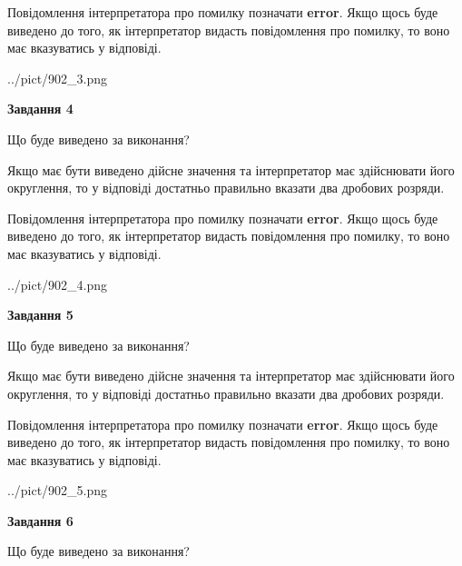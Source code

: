 \documentclass[12pt, ukrainian]{article}
\begin{document}
{\begin {Large}
Повідомлення інтерпретатора про помилку позначати \textbf{error}.
Якщо щось буде виведено до того, як інтерпретатор видасть повідомлення про помилку, 
то воно має вказуватись у відповіді. \par

\begin{center}
	{../pict/902_3.png}
\end{center}
\newpage

{\begin {center}\textbf{Завдання 4}\end {center}}\par
Що буде виведено за виконання? \par

Якщо має бути виведено дійсне значення та інтерпретатор має здійснювати його округлення, 
то у відповіді достатньо правильно вказати два дробових розряди.

Повідомлення інтерпретатора про помилку позначати \textbf{error}.
Якщо щось буде виведено до того, як інтерпретатор видасть повідомлення про помилку, 
то воно має вказуватись у відповіді. \par

\begin{center}
	{../pict/902_4.png}
\end{center}
\newpage

{\begin {center}\textbf{Завдання 5}\end {center}}\par
Що буде виведено за виконання? \par

Якщо має бути виведено дійсне значення та інтерпретатор має здійснювати його округлення, 
то у відповіді достатньо правильно вказати два дробових розряди.

Повідомлення інтерпретатора про помилку позначати \textbf{error}.
Якщо щось буде виведено до того, як інтерпретатор видасть повідомлення про помилку, 
то воно має вказуватись у відповіді. \par

\begin{center}
	{../pict/902_5.png}
\end{center}
\newpage

{\begin {center}\textbf{Завдання 6}\end {center}}\par
Що буде виведено за виконання? \par


\end{Large}}
\end{document}
